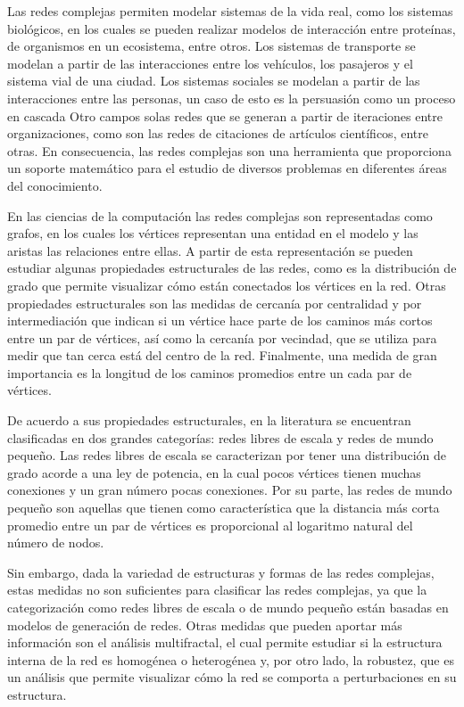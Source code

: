 Las redes complejas permiten modelar sistemas de la vida real, como los sistemas biológicos\cite{Costa2008}, en los cuales se pueden realizar modelos de interacción entre proteínas, de organismos en un ecosistema, entre otros. Los sistemas de transporte se modelan a partir de las interacciones entre los vehículos, los pasajeros y el sistema vial de una ciudad\cite{Wu2018}. Los sistemas sociales se modelan a partir de las interacciones entre las personas, un caso de esto es la persuasión como un proceso en cascada\cite{Huang2016} Otro campos solas redes que se generan a partir de iteraciones entre organizaciones, como son las redes de citaciones de artículos científicos\cite{Zhang2013}, entre otras. En consecuencia, las redes complejas son una herramienta que proporciona un soporte matemático para el estudio de diversos problemas en diferentes áreas del conocimiento.

En las ciencias de la computación las redes complejas\cite{BarabasiNetwork} son representadas como grafos, en los cuales los vértices representan una entidad en el modelo y las aristas las relaciones entre ellas. A partir de esta representación se pueden estudiar algunas propiedades estructurales de las redes, como es la distribución de grado que permite visualizar cómo están conectados los vértices en la red. Otras propiedades estructurales son las medidas de cercanía por centralidad y por intermediación que indican si un vértice hace parte de los caminos más cortos entre un par de vértices, así como la cercanía por vecindad, que se utiliza para medir que tan cerca está del centro de la red. Finalmente, una medida de gran importancia es la longitud de los caminos promedios entre un cada par de vértices.

De acuerdo a sus propiedades estructurales, en la literatura se encuentran clasificadas en dos grandes categorías: redes libres de escala y redes de mundo pequeño. Las redes libres de escala se caracterizan por tener una distribución de grado acorde a una ley de potencia, en la cual pocos vértices tienen muchas conexiones y un gran número pocas conexiones. Por su parte, las redes de mundo pequeño son aquellas que tienen como característica que la distancia más corta promedio entre un par de vértices es proporcional al logaritmo natural del número de nodos. 

Sin embargo, dada la variedad de estructuras y formas de las redes complejas, estas medidas no son suficientes para clasificar las redes complejas\cite{Song2005}, ya que la categorización como redes libres de escala o de mundo pequeño están basadas en modelos de generación de redes\cite{Barabaacutesi1999}. Otras medidas que pueden aportar más información son el análisis multifractal\cite{Li2014}, el cual permite estudiar si la estructura interna de la red es homogénea o heterogénea y, por otro lado, la robustez\cite{Schneider2011}, que es un análisis que permite visualizar cómo la red se comporta a perturbaciones en su estructura.

